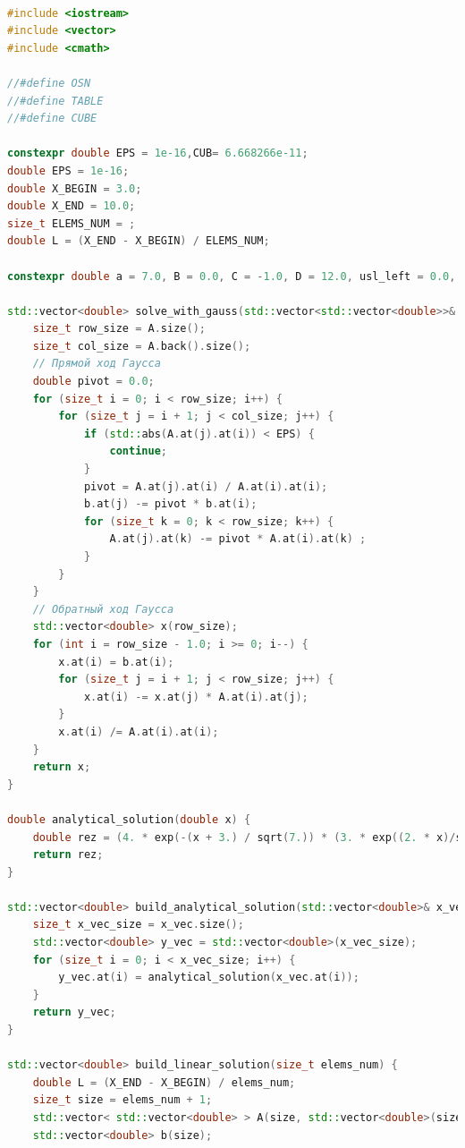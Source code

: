 \begin{lstlisting}[language=c++, label=prog,caption={\textit{Реализация МКЭ}}]

#include <iostream>
#include <vector>
#include <cmath>

//#define OSN 
//#define TABLE
//#define CUBE

constexpr double EPS = 1e-16,CUB= 6.668266e-11;
double EPS = 1e-16;
double X_BEGIN = 3.0;
double X_END = 10.0;
size_t ELEMS_NUM = ;
double L = (X_END - X_BEGIN) / ELEMS_NUM;

constexpr double a = 7.0, B = 0.0, C = -1.0, D = 12.0, usl_left = 0.0, usl_right = 20.0; // au"+Bu'+Cu+D=0

std::vector<double> solve_with_gauss(std::vector<std::vector<double>>& A, std::vector<double>& b){
    size_t row_size = A.size();
    size_t col_size = A.back().size();
    // Прямой ход Гаусса
    double pivot = 0.0;
    for (size_t i = 0; i < row_size; i++) {
        for (size_t j = i + 1; j < col_size; j++) {
            if (std::abs(A.at(j).at(i)) < EPS) {
                continue;
            }
            pivot = A.at(j).at(i) / A.at(i).at(i);
            b.at(j) -= pivot * b.at(i);
            for (size_t k = 0; k < row_size; k++) {
                A.at(j).at(k) -= pivot * A.at(i).at(k) ;
            }
        }
    }
    // Обратный ход Гаусса
    std::vector<double> x(row_size);
    for (int i = row_size - 1.0; i >= 0; i--) {
        x.at(i) = b.at(i);
        for (size_t j = i + 1; j < row_size; j++) {
            x.at(i) -= x.at(j) * A.at(i).at(j);
        }
        x.at(i) /= A.at(i).at(i);
    }
    return x;
}

double analytical_solution(double x) {
    double rez = (4. * exp(-(x + 3.) / sqrt(7.)) * (3. * exp((2. * x)/sqrt(7.)) - 3. * exp((x + 3.)/sqrt(7.)) + 3. * exp((x + 17.)/sqrt(7.)) + 2. * exp((2. * x + 7.)/sqrt(7.)) - 2. * exp(13. /sqrt(7.)) - 3. * exp(20./sqrt(7.))))/(exp(2. * sqrt(7.)) - 1.);
    return rez;
}

std::vector<double> build_analytical_solution(std::vector<double>& x_vec) {
    size_t x_vec_size = x_vec.size();
    std::vector<double> y_vec = std::vector<double>(x_vec_size);
    for (size_t i = 0; i < x_vec_size; i++) {
        y_vec.at(i) = analytical_solution(x_vec.at(i));
    }
    return y_vec;
}

std::vector<double> build_linear_solution(size_t elems_num) {
    double L = (X_END - X_BEGIN) / elems_num;
    size_t size = elems_num + 1;
    std::vector< std::vector<double> > A(size, std::vector<double>(size));
    std::vector<double> b(size);
    

\end{lstlisting}
